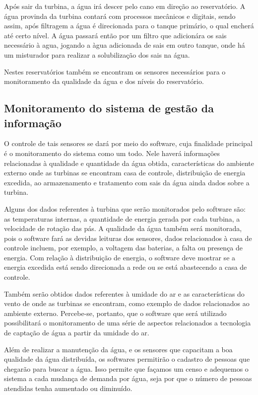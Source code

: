 Após sair da turbina, a água irá descer pelo cano em direção ao reservatório. A água provinda da turbina contará com processos
mecânicos e digitais, sendo assim, após filtragem a água é direcionada para o tanque primário, o qual encherá até certo nível.
A água passará então por um filtro que adicionára os sais necessário à agua, jogando a àgua adicionada de sais em outro tanque,
onde há um misturador para realizar a solubilização dos sais na água.

Nestes reservatórios também se encontram os sensores necessários para o monitoramento da qualidade da água e dos níveis do reservatório.


\subsection{Monitoramento do sistema de gestão da informação}

  O controle de tais sensores se dará por meio do software, cuja finalidade principal é o monitoramento do sistema como um todo. Nele haverá informações relacionadas à qualidade e quantidade da água obtida, características do ambiente externo onde as turbinas se encontram casa de controle, distribuição de energia excedida, ao armazenamento e tratamento com sais da água ainda dados sobre a turbina.
	 
  Alguns dos dados referentes à turbina que serão monitorados pelo software são: as temperaturas internas, a quantidade de energia gerada por cada turbina, a velocidade de rotação das pás. A qualidade da água também será monitorada, pois o software fará as devidas leituras dos sensores, dados relacionados à casa de controle incluem, por exemplo, a voltagem das baterias, a falta ou presença de energia. Com relação à distribuição de energia, o software deve mostrar se a energia excedida está sendo direcionada a rede ou se está abastecendo a casa de controle.

  Também serão obtidos dados referentes à umidade do ar e as características do vento de onde as turbinas se encontram, como exemplo de dados relacionados ao ambiente externo. Percebe-se, portanto, que o software que será utilizado possibilitará o monitoramento de uma série de aspectos relacionados a tecnologia de captação de água a partir da umidade do ar.

  Além de realizar a manutenção da água, e os sensores que capacitam a boa qualidade da água distribuída, os softwares permitirão o cadastro de pessoas que chegarão para buscar a água. Isso permite que façamos um censo e adequemos o sistema a cada mudança de demanda por água, seja por que o número de pessoas atendidas tenha aumentado ou diminuído.

